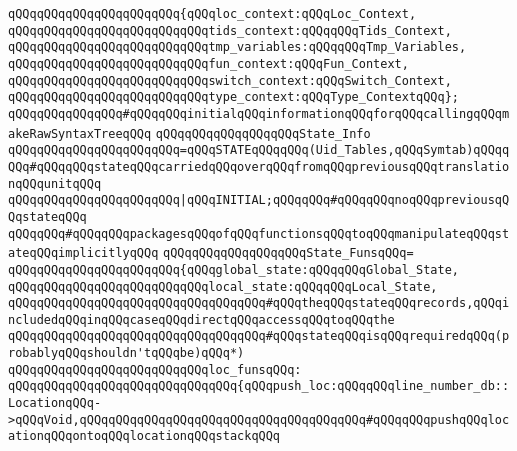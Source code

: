 \verb|qQQqqQQqqQQqqQQqqQQqqQQq{qQQqloc_context:qQQqLoc_Context,|\newline
\verb|qQQqqQQqqQQqqQQqqQQqqQQqqQQqtids_context:qQQqqQQqTids_Context,|\newline
\verb|qQQqqQQqqQQqqQQqqQQqqQQqqQQqtmp_variables:qQQqqQQqTmp_Variables,|\newline
\verb|qQQqqQQqqQQqqQQqqQQqqQQqqQQqfun_context:qQQqFun_Context,|\newline
\verb|qQQqqQQqqQQqqQQqqQQqqQQqqQQqswitch_context:qQQqSwitch_Context,|\newline
\verb|qQQqqQQqqQQqqQQqqQQqqQQqqQQqtype_context:qQQqType_ContextqQQq};|\newline
\newline
\verb|qQQqqQQqqQQqqQQq#qQQqqQQqinitialqQQqinformationqQQqforqQQqcallingqQQqmakeRawSyntaxTreeqQQq|\newline
\verb|qQQqqQQqqQQqqQQqqQQqState_Info|\newline
\verb|qQQqqQQqqQQqqQQqqQQqqQQq=qQQqSTATEqQQqqQQq(Uid_Tables,qQQqSymtab)qQQqqQQq#qQQqqQQqstateqQQqcarriedqQQqoverqQQqfromqQQqpreviousqQQqtranslationqQQqunitqQQq|\newline
\verb|qQQqqQQqqQQqqQQqqQQqqQQq|\verb#|qQQqINITIAL;qQQqqQQq#\verb|#qQQqqQQqnoqQQqpreviousqQQqstateqQQq|\newline
\newline
\newline
\verb|qQQqqQQq#qQQqqQQqpackagesqQQqofqQQqfunctionsqQQqtoqQQqmanipulateqQQqstateqQQqimplicitlyqQQq|\newline
\newline
\verb|qQQqqQQqqQQqqQQqqQQqState_FunsqQQq=|\newline
\verb|qQQqqQQqqQQqqQQqqQQqqQQq{qQQqglobal_state:qQQqqQQqGlobal_State,|\newline
\verb|qQQqqQQqqQQqqQQqqQQqqQQqqQQqlocal_state:qQQqqQQqLocal_State,|\newline
\verb|qQQqqQQqqQQqqQQqqQQqqQQqqQQqqQQqqQQq#qQQqtheqQQqstateqQQqrecords,qQQqincludedqQQqinqQQqcaseqQQqdirectqQQqaccessqQQqtoqQQqthe|\newline
\verb|qQQqqQQqqQQqqQQqqQQqqQQqqQQqqQQqqQQq#qQQqstateqQQqisqQQqrequiredqQQq(probablyqQQqshouldn'tqQQqbe)qQQq*)|\newline
\newline
\verb|qQQqqQQqqQQqqQQqqQQqqQQqqQQqloc_funsqQQq:|\newline
\verb|qQQqqQQqqQQqqQQqqQQqqQQqqQQqqQQq{qQQqpush_loc:qQQqqQQqline_number_db::LocationqQQq->qQQqVoid,qQQqqQQqqQQqqQQqqQQqqQQqqQQqqQQqqQQqqQQq#qQQqqQQqpushqQQqlocationqQQqontoqQQqlocationqQQqstackqQQq|\newline

